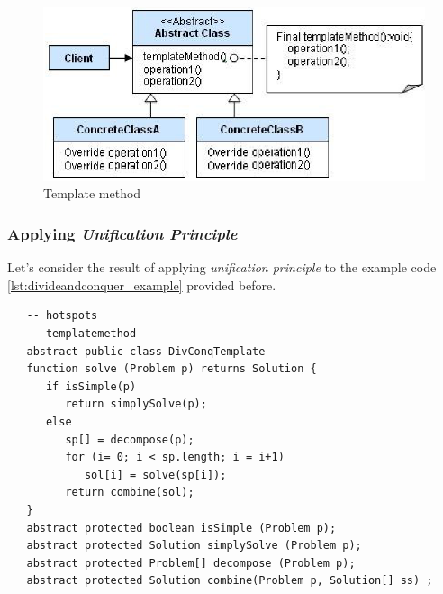 \begin{figure}[htbp]
   \centering
   \includegraphics{images/dp_templatemethod.png}
   \caption{Template method}
   \label{fig:dp_templatemethod}
\end{figure}

\subsubsection{Applying \textit{Unification Principle}}
Let's consider the result of applying \textit{unification principle} to the example code \ref{lst:divideandconquer_example} provided before.
\begin{lstlisting}
   -- hotspots
   -- templatemethod
   abstract public class DivConqTemplate
   function solve (Problem p) returns Solution {
      if isSimple(p)
         return simplySolve(p);
      else
         sp[] = decompose(p);
         for (i= 0; i < sp.length; i = i+1)
            sol[i] = solve(sp[i]);
         return combine(sol);
   }
   abstract protected boolean isSimple (Problem p);
   abstract protected Solution simplySolve (Problem p);
   abstract protected Problem[] decompose (Problem p);
   abstract protected Solution combine(Problem p, Solution[] ss) ;
\end{lstlisting}
\lstset{style=javaBlockAnn}

